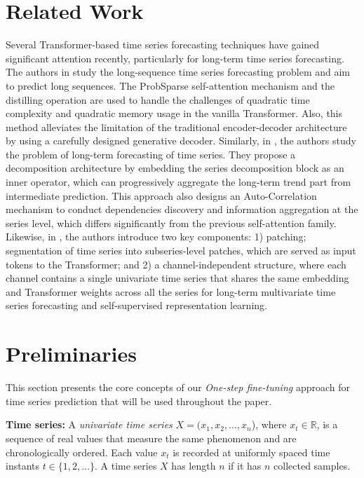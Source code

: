 \documentclass[letterpaper]{article} %
\begin{document}
\section{Related Work}
Several Transformer-based time series forecasting techniques have gained significant attention recently, particularly for long-term time series forecasting. The authors in \cite{zhou2021informer} study the long-sequence time series forecasting problem and aim to predict long sequences. The ProbSparse self-attention mechanism and the distilling operation are used to handle the challenges of quadratic time complexity and quadratic memory usage in the vanilla Transformer. Also, this method alleviates the limitation of the traditional encoder-decoder architecture by using a carefully designed generative decoder. Similarly, in \cite{wu2021autoformer}, the authors study the problem of long-term forecasting of time series. They propose a decomposition architecture by embedding the series decomposition block as an inner operator, which can progressively aggregate the long-term trend part from intermediate prediction. This approach also designs an Auto-Correlation mechanism to conduct dependencies discovery and information aggregation at the series level, which differs significantly from the previous self-attention family. Likewise, in \cite{nie2022time}, the authors introduce two key components: 1) patching; segmentation of time series into subseries-level patches, which are served as input tokens to the Transformer; and 2) a channel-independent structure, where each channel contains a single univariate time series that shares the same embedding and Transformer weights across all the series for long-term multivariate time series forecasting and self-supervised representation learning.

\section{Preliminaries}
This section presents the core concepts of our \emph{One-step fine-tuning} approach for time series prediction that will be used throughout the paper.

\hspace{0.12in}\textbf{Time series:}
A \emph{univariate time series} $X = (x_{1}, x_{2},\ldots, x_n$), where $x_{t} \in \mathbb{R}$, is a sequence of real values that measure the same phenomenon and are chronologically ordered. Each value $x_t$ is recorded at uniformly spaced time instants $t\in \{1,2,\ldots\}$. A time series $X$ has length $n$ if it has $n$ collected samples.
\end{document}
